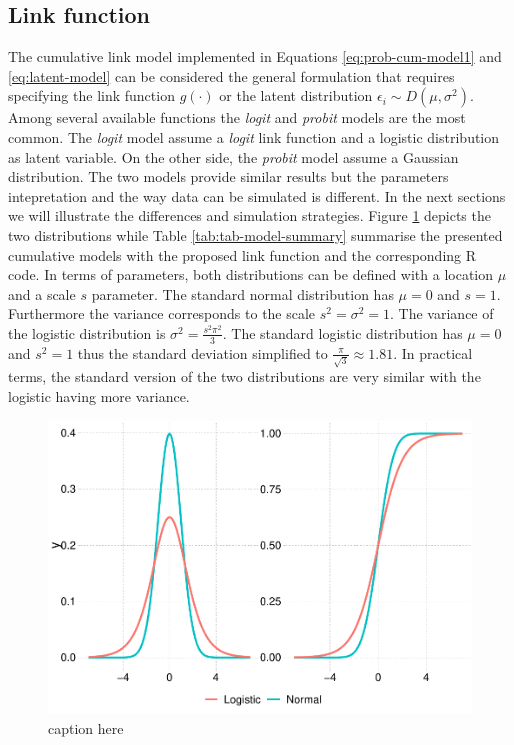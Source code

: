 \documentclass[
  man,floatsintext]{apa6}
\begin{document}
\subsection{Link function}\label{link-function}

The cumulative link model implemented in Equations \eqref{eq:prob-cum-model1} and \eqref{eq:latent-model} can be considered the general formulation that requires specifying the link function \(g(\cdot)\) or the latent distribution \(\epsilon_i \sim D(\mu, \sigma^2)\). Among several available functions the \emph{logit} and \emph{probit} models are the most common. The \emph{logit} model assume a \emph{logit} link function and a logistic distribution as latent variable. On the other side, the \emph{probit} model assume a Gaussian distribution. The two models provide similar results but the parameters intepretation and the way data can be simulated is different. In the next sections we will illustrate the differences and simulation strategies. Figure \ref{fig:fig-logit-vs-probit} depicts the two distributions while Table \ref{tab:tab-model-summary} summarise the presented cumulative models with the proposed link function and the corresponding R code. In terms of parameters, both distributions can be defined with a location \(\mu\) and a scale \(s\) parameter. The standard normal distribution has \(\mu = 0\) and \(s = 1\). Furthermore the variance corresponds to the scale \(s^2 = \sigma^2 = 1\). The variance of the logistic distribution is \(\sigma^2 = \frac{s^2\pi^2}{3}\). The standard logistic distribution has \(\mu = 0\) and \(s^2 = 1\) thus the standard deviation simplified to \(\frac{\pi}{\sqrt{3}} \approx 1.81\). In practical terms, the standard version of the two distributions are very similar with the logistic having more variance.

\scriptsize

\begin{figure}

{\centering \includegraphics{paper-new_files/figure-latex/fig-logit-vs-probit-1} 

}

\caption{caption here}\label{fig:fig-logit-vs-probit}
\end{figure}
\end{document}
